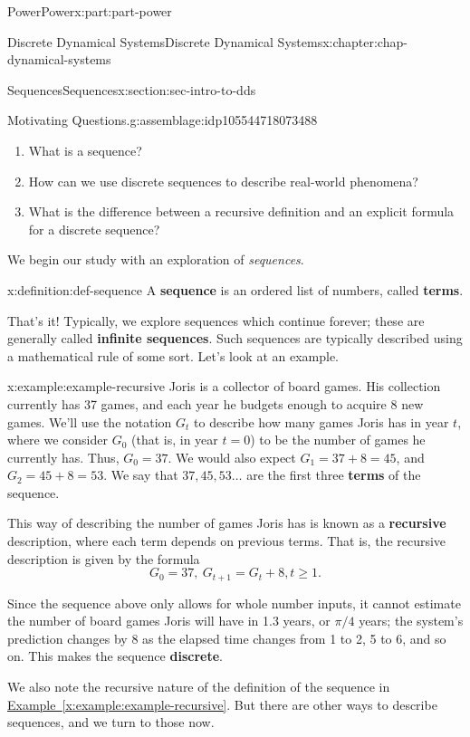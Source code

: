 \documentclass[oneside,10pt,]{book}
\newcommand{\xreffont}{\relax}
\newcommand{\terminology}[1]{\textbf{#1}}
\numberwithin{equation}{section}
\renewcommand{\ge}{\geqslant}
\begin{document}
\begin{partptx}{Power}{}{Power}{}{}{x:part:part-power}
\begin{chapterptx}{Discrete Dynamical Systems}{}{Discrete Dynamical Systems}{}{}{x:chapter:chap-dynamical-systems}
\begin{sectionptx}{Sequences}{}{Sequences}{}{}{x:section:sec-intro-to-dds}
\begin{assemblage}{Motivating Questions.}{g:assemblage:idp105544718073488}
\begin{enumerate}
\item{}What is a sequence?%
\item{}How can we use discrete sequences to describe real-world phenomena?%
\item{}What is the difference between a recursive definition and an explicit formula for a discrete sequence?%
\end{enumerate}
%
\end{assemblage}
We begin our study with an exploration of \emph{sequences}.%
\begin{definition}{}{x:definition:def-sequence}%
%
%
A \terminology{sequence} is an ordered list of numbers, called \terminology{terms}.%
\end{definition}
That's it! Typically, we explore sequences which continue forever; these are generally called \terminology{infinite sequences}. Such sequences are typically described using a mathematical rule of some sort. Let's look at an example.%
\begin{example}{}{x:example:example-recursive}%
Joris is a collector of board games. His collection currently has 37 games, and each year he budgets enough to acquire 8 new games. We'll use the notation \(G_t\) to describe how many games Joris has in year \(t\), where we consider \(G_0\) (that is, in year \(t=0\)) to be the number of games he currently has. Thus, \(G_0 = 37\). We would also expect \(G_1 = 37 + 8 = 45\), and \(G_2 = 45 + 8 = 53\). We say that \(37, 45, 53\ldots\) are the first three \terminology{terms} of the sequence.%
\par
This way of describing the number of games Joris has is known as a \terminology{recursive} description, where each term depends on previous terms. That is, the recursive description is given by the formula%
\begin{equation}
G_0 = 37, \ G_{t+1} = G_t + 8, t \ge 1.\label{x:men:eq-recursive-games}
\end{equation}
%
\end{example}
Since the sequence above only allows for whole number inputs, it cannot estimate the number of board games Joris will have in 1.3 years, or \(\pi/4\) years; the system's prediction changes by 8 as the elapsed time changes from 1 to 2, 5 to 6, and so on. This makes the sequence \terminology{discrete}.%
\par
We also note the recursive nature of the definition of the sequence in \hyperref[x:example:example-recursive]{Example~{\xreffont\ref{x:example:example-recursive}}}. But there are other ways to describe sequences, and we turn to those now.%

\end{sectionptx}
\end{chapterptx}
\end{partptx}
\end{document}
